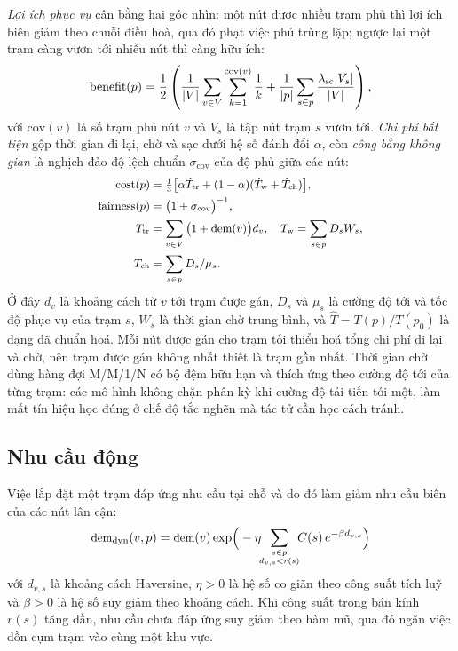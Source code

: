 \documentclass[10pt, conference, a4paper, compsocconf]{IEEEtran}
\begin{document}
\emph{Lợi ích phục vụ} cân bằng hai góc nhìn: một nút được nhiều trạm phủ thì
lợi ích biên giảm theo chuỗi điều hoà, qua đó phạt việc phủ trùng lặp; ngược
lại một trạm càng vươn tới nhiều nút thì càng hữu ích:
\begin{equation}\small
\label{eq:benefit}
\mathrm{benefit}(p)=\frac{1}{2}\left(
\frac{1}{|V|}\sum_{v\in V}\sum_{k=1}^{\mathrm{cov}(v)}\frac{1}{k}
+\frac{1}{|p|}\sum_{s\in p}\frac{\lambda_{\mathrm{sc}}|V_s|}{|V|}
\right),
\end{equation}
với $\mathrm{cov}(v)$ là số trạm phủ nút $v$ và $V_s$ là tập nút trạm $s$ vươn
tới. \emph{Chi phí bất tiện} gộp thời gian đi lại, chờ và sạc dưới hệ số đánh
đổi $\alpha$, còn \emph{công bằng không gian} là nghịch đảo độ lệch chuẩn
$\sigma_{\mathrm{cov}}$ của độ phủ giữa các nút:
\begin{equation}\small
\label{eq:costfair}
\begin{aligned}
\mathrm{cost}(p) &= \tfrac{1}{3}\big[\alpha\hat T_{\mathrm{tr}}+(1-\alpha)(\hat T_{\mathrm{w}}+\hat T_{\mathrm{ch}})\big],\\
\mathrm{fairness}(p) &= \big(1+\sigma_{\mathrm{cov}}\big)^{-1},\\
T_{\mathrm{tr}} &= \sum_{v\in V}\big(1+\text{dem}(v)\big)d_v,\quad
T_{\mathrm{w}} = \sum_{s\in p}D_s W_s,\\
T_{\mathrm{ch}} &= \sum_{s\in p}D_s/\mu_s .
\end{aligned}
\end{equation}
Ở đây $d_v$ là khoảng cách từ $v$ tới trạm được gán, $D_s$ và $\mu_s$ là cường
độ tới và tốc độ phục vụ của trạm $s$, $W_s$ là thời gian chờ trung bình, và
$\hat T = T(p)/T(p_0)$ là dạng đã chuẩn hoá. Mỗi nút được gán cho trạm tối
thiểu hoá tổng chi phí đi lại và chờ, nên trạm được gán không nhất thiết là
trạm gần nhất. Thời gian chờ dùng hàng đợi
M/M/1/N có bộ đệm hữu hạn và thích ứng theo cường độ tới của từng trạm: các mô
hình không chặn phân kỳ khi cường độ tải tiến tới một, làm mất tín hiệu học
đúng ở chế độ tắc nghẽn mà tác tử cần học cách tránh.


\subsection{Nhu cầu động}

Việc lắp đặt một trạm đáp ứng nhu cầu tại chỗ và do đó làm giảm nhu cầu biên
của các nút lân cận:
\begin{equation}\small
\label{eq:demand}
\text{dem}_{\text{dyn}}(v,p) = \text{dem}(v)\exp\!\Big(-\eta\!\!\sum_{\substack{s\in p\\ d_{v,s}<r(s)}}\!\! C(s)\,e^{-\beta d_{v,s}}\Big)
\end{equation}
với $d_{v,s}$ là khoảng cách Haversine, $\eta>0$ là hệ số co giãn theo công
suất tích luỹ và $\beta>0$ là hệ số suy giảm theo khoảng cách. Khi công suất
trong bán kính $r(s)$ tăng dần, nhu cầu chưa đáp ứng suy giảm theo hàm mũ, qua
đó ngăn việc dồn cụm trạm vào cùng một khu vực.
\end{document}
